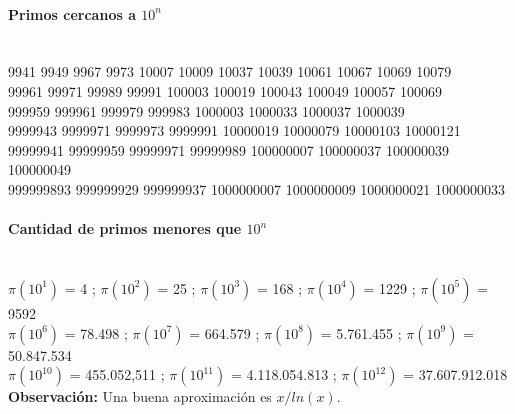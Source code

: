 {\paragraph{Primos cercanos a $10^n$}\ \\
9941 9949 9967 9973 10007 10009 10037 10039 10061 10067 10069 10079\\
99961 99971 99989 99991 100003 100019 100043 100049 100057 100069\\
999959 999961 999979 999983 1000003 1000033 1000037 1000039\\
9999943 9999971 9999973 9999991 10000019 10000079 10000103 10000121\\
99999941 99999959 99999971 99999989 100000007 100000037 100000039 100000049\\
999999893 999999929 999999937 1000000007 1000000009 1000000021 1000000033
 
\paragraph{Cantidad de primos menores que $10^n$}\ \\
$\pi(10^1)$ = 4 ;
$\pi(10^2)$ = 25 ;
$\pi(10^3)$ = 168 ;
$\pi(10^4)$ = 1229 ;
$\pi(10^5)$ = 9592 \\
$\pi(10^6)$ = 78.498 ;
$\pi(10^7)$ = 664.579 ;
$\pi(10^8)$ = 5.761.455 ;
$\pi(10^9)$ = 50.847.534 \\
$\pi(10^{10})$ = 455.052,511 ;
$\pi(10^{11})$ = 4.118.054.813 ;
$\pi(10^{12})$ = 37.607.912.018 \\
\textbf{Observación:} Una buena aproximación es $x/ln(x)$.
%
%
%
}
